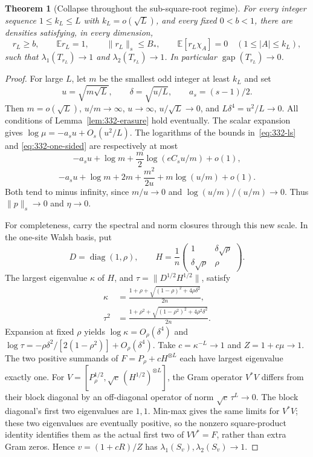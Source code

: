\documentclass[11pt]{article}
\newtheorem{theorem}{Theorem}
\newcommand{\diag}{\operatorname{diag}}
\newcommand{\gap}{\operatorname{gap}}
\begin{document}
\begin{theorem}[Collapse throughout the sub-square-root regime]
\label{thm:332-subroot}
For every integer sequence $1\le k_L\le L$ with $k_L=o(\sqrt L)$,
and every fixed $0<b<1$, there are densities satisfying, in every dimension,
\[
 r_L\ge b,\qquad \mathbb E r_L=1,\qquad \|r_L\|_s\le B_* ,
 \qquad \mathbb E[r_L\chi_A]=0\quad(1\le|A|\le k_L),
\]
such that $\lambda_1(T_{r_L})\to1$ and $\lambda_2(T_{r_L})\to1$.
In particular $\gap(T_{r_L})\to0$.
\end{theorem}
\begin{proof}
For large $L$, let $m$ be the smallest odd integer at least $k_L$ and set
\[
 u=\sqrt{m\sqrt L},\qquad \delta=\sqrt{u/L},\qquad a_s=(s-1)/2.
\]
Then $m=o(\sqrt L)$, $u/m\to\infty$, $u\to\infty$,
$u/\sqrt L\to0$, and $L\delta^4=u^2/L\to0$.
All conditions of Lemma~\ref{lem:332-erasure} hold eventually.
The scalar expansion gives $\log\mu=-a_su+O_s(u^2/L)$.
The logarithms of the bounds in~\eqref{eq:332-ls} and
\eqref{eq:332-one-sided} are respectively at most
\[
 -a_su+\log m+\frac m2\log(eC_su/m)+o(1),
\]
\[
 -a_su+\log m+2m+\frac{m^2}{2u}+m\log(u/m)+o(1).
\]
Both tend to minus infinity, since $m/u\to0$ and
$\log(u/m)/(u/m)\to0$. Thus $\|p\|_s\to0$ and $\eta\to0$.

For completeness, carry the spectral and norm closures through this
new scale. In the one-site Walsh basis, put
\[
 D=\diag(1,\rho),\qquad
 H=\frac1n\begin{pmatrix}1&\delta\sqrt\rho\\
                         \delta\sqrt\rho&\rho\end{pmatrix}.
\]
The largest eigenvalue $\kappa$ of $H$, and
$\tau=\|D^{1/2}H^{1/2}\|$, satisfy
\begin{align}
 \kappa&=\frac{1+\rho+\sqrt{(1-\rho)^2+4\rho\delta^2}}{2n},
       \label{eq:332-kappa}\\
 \tau^2&=\frac{1+\rho^2+\sqrt{(1-\rho^2)^2+4\rho^2\delta^2}}{2n}.
       \label{eq:332-tau}
\end{align}
Expansion at fixed $\rho$ yields
$\log\kappa=O_\rho(\delta^4)$ and
$\log\tau=-\rho\delta^2/[2(1-\rho^2)]+O_\rho(\delta^4)$.
Take $c=\kappa^{-L}\to1$ and $Z=1+c\mu\to1$.
The two positive summands of $F=P_\rho+cH^{\otimes L}$ each have
largest eigenvalue exactly one. For
$V=[P_\rho^{1/2},\sqrt c\,(H^{1/2})^{\otimes L}]$, the Gram operator
$V^*V$ differs from their block diagonal by an off-diagonal operator
of norm $\sqrt c\,\tau^L\to0$. The block diagonal's first two
eigenvalues are $1,1$. Min-max gives the same limits for $V^*V$;
these two eigenvalues are eventually positive, so the nonzero
square-product identity identifies them as the actual first two
of $VV^*=F$, rather than extra Gram zeros. Hence
$v=(1+cR)/Z$ has $\lambda_1(S_v),\lambda_2(S_v)\to1$.


\end{proof}
\end{document}
